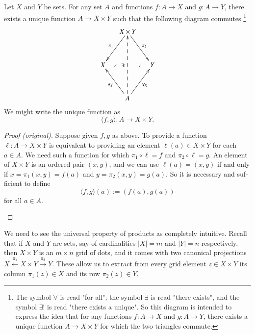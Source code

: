 \documentclass{book}
\def\to{\rightarrow}
\def\taking{\colon}
\def\la{\langle}
\def\ra{\rangle}
\newcommand{\To}[1]{\xrightarrow{#1}}
\newcommand{\From}[1]{\xleftarrow{#1}}
\newcommand{\prodmap}[2]{\la#1,#2\ra}
\theoremstyle{theoremENG}
\theoremstyle{lemmaENG}
\newtheorem{lemmaENG}[subsubsection]{\begin{english}Lemma\end{english}}
\theoremstyle{propositionENG}
\theoremstyle{corollaryENG}
\theoremstyle{factENG}
\theoremstyle{remarkENG}
\theoremstyle{exampleENG}
\newtheorem{exampleENG}[subsubsection]{\begin{english}Example\end{english}}
\theoremstyle{warningENG}
\theoremstyle{questionENG}
\theoremstyle{guessENG}
\theoremstyle{answerENG}
\theoremstyle{constructionENG}
\theoremstyle{rulesENG}
\theoremstyle{excENG}
\theoremstyle{appENG}
\theoremstyle{definitionENG}
\theoremstyle{notationENG}
\theoremstyle{conjectureENG}
\theoremstyle{postulateENG}
\newenvironment{proofENG}{\begin{proof}[Proof (original)]}{\end{proof}}
\theoremstyle{theoremRUS}
\theoremstyle{lemmaRUS}
\theoremstyle{propositionRUS}
\theoremstyle{corollaryRUS}
\theoremstyle{factRUS}
\theoremstyle{remarkRUS}
\theoremstyle{exampleRUS}
\theoremstyle{warningRUS}
\theoremstyle{questionRUS}
\theoremstyle{guessRUS}
\theoremstyle{answerRUS}
\theoremstyle{constructionRUS}
\theoremstyle{rulesRUS}
\theoremstyle{excRUS}
\theoremstyle{appRUS}
\theoremstyle{definitionRUS}
\theoremstyle{notationRUS}
\theoremstyle{conjectureRUS}
\theoremstyle{postulateRUS}
\begin{document}
\begin{english}
\begin{lemmaENG}\label{lemma:up for prod}

Let $X$ and $Y$ be sets. For any set $A$ and functions $f\taking A\to X$ and $g\taking A\to Y$, there exists a unique function $A\to X\times Y$ such that the following diagram commutes \footnote{The symbol $\forall$ is read "for all"; the symbol $\exists$ is read "there exists", and the symbol $\exists!$ is read "there exists a unique". So this diagram is intended to express the idea that for any functions $f\taking A\to X$ and $g\taking A\to Y$, there exists a unique function $A\to X\times Y$ for which the two triangles commute.}
\begin{align}\label{dia:univ prop for products}
\xymatrix@=15pt{&X\times Y\ar[ldd]_{\pi_1}\ar[rdd]^{\pi_2}\\\\X\ar@{}[r]|{\checkmark}&&Y\ar@{}[l]|{\checkmark}\\\\&A\ar[luu]^{\forall f}\ar[ruu]_{\forall g}\ar@{-->}[uuuu]^{\exists !}}
\end{align}
We might write the unique function as $$\prodmap{f}{g}\taking A\to X\times Y.$$

\begin{russian} \end{russian}

\end{lemmaENG}

\begin{proofENG}

Suppose given $f,g$ as above. To provide a function $\ell\taking A\to X\times Y$ is equivalent to providing an element $\ell(a)\in X\times Y$ for each $a\in A$. We need such a function for which $\pi_1\circ \ell=f$ and $\pi_2\circ \ell=g$. An element of $X\times Y$ is an ordered pair $(x,y)$, and we can use $\ell(a)=(x,y)$ if and only if $x=\pi_1(x,y)=f(a)$ and $y=\pi_2(x,y)=g(a)$. So it is necessary and sufficient to define $$\prodmap{f}{g}(a):=(f(a),g(a))$$ for all $a\in A$.

\begin{russian} \end{russian}

\end{proofENG}

\begin{exampleENG}\label{ex:grid2}

We need to see the universal property of products as completely intuitive. Recall that if $X$ and $Y$ are sets, say of cardinalities $|X|=m$ and $|Y|=n$ respectively, then $X\times Y$ is an $m\times n$ grid of dots, and it comes with two canonical projections $X\From{\pi_1}X\times Y\To{\pi_2}Y$. These allow us to extract from every grid element $z\in X\times Y$ its column $\pi_1(z)\in X$ and its row $\pi_2(z)\in Y$.


\end{exampleENG}
\end{english}
\end{document}
